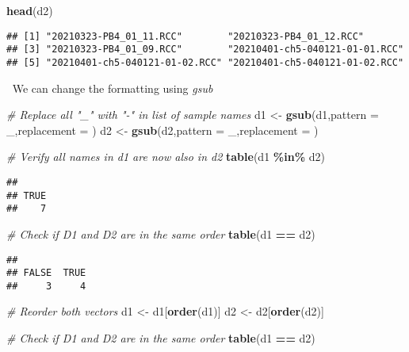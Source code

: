 \documentclass[
]{article}
\newenvironment{Shaded}{\begin{snugshade}}{\end{snugshade}}
\newcommand{\AttributeTok}[1]{\textcolor[rgb]{0.13,0.29,0.53}{#1}}
\newcommand{\CommentTok}[1]{\textcolor[rgb]{0.56,0.35,0.01}{\textit{#1}}}
\newcommand{\FunctionTok}[1]{\textcolor[rgb]{0.13,0.29,0.53}{\textbf{#1}}}
\newcommand{\NormalTok}[1]{#1}
\newcommand{\OtherTok}[1]{\textcolor[rgb]{0.56,0.35,0.01}{#1}}
\newcommand{\SpecialCharTok}[1]{\textcolor[rgb]{0.81,0.36,0.00}{\textbf{#1}}}
\newcommand{\StringTok}[1]{\textcolor[rgb]{0.31,0.60,0.02}{#1}}
\begin{document}
\begin{Shaded}
\begin{Highlighting}[]
\FunctionTok{head}\NormalTok{(d2)}
\end{Highlighting}
\end{Shaded}

\begin{verbatim}
## [1] "20210323-PB4_01_11.RCC"        "20210323-PB4_01_12.RCC"       
## [3] "20210323-PB4_01_09.RCC"        "20210401-ch5-040121-01-01.RCC"
## [5] "20210401-ch5-040121-01-02.RCC" "20210401-ch5-040121-01-02.RCC"
\end{verbatim}

\(~\) We can change the formatting using \emph{gsub}

\begin{Shaded}
\begin{Highlighting}[]
\CommentTok{\# Replace all "\_" with "{-}" in list of sample names}
\NormalTok{d1 }\OtherTok{\textless{}{-}} \FunctionTok{gsub}\NormalTok{(d1,}\AttributeTok{pattern =} \StringTok{\textquotesingle{}\_\textquotesingle{}}\NormalTok{,}\AttributeTok{replacement =} \StringTok{\textquotesingle{}{-}\textquotesingle{}}\NormalTok{)}
\NormalTok{d2 }\OtherTok{\textless{}{-}} \FunctionTok{gsub}\NormalTok{(d2,}\AttributeTok{pattern =} \StringTok{\textquotesingle{}\_\textquotesingle{}}\NormalTok{,}\AttributeTok{replacement =} \StringTok{\textquotesingle{}{-}\textquotesingle{}}\NormalTok{)}

\CommentTok{\# Verify all names in d1 are now also in d2}
\FunctionTok{table}\NormalTok{(d1 }\SpecialCharTok{\%in\%}\NormalTok{ d2)}
\end{Highlighting}
\end{Shaded}

\begin{verbatim}
## 
## TRUE 
##    7
\end{verbatim}

\begin{Shaded}
\begin{Highlighting}[]
\CommentTok{\# Check if D1 and D2 are in the same order}
\FunctionTok{table}\NormalTok{(d1 }\SpecialCharTok{==}\NormalTok{ d2)}
\end{Highlighting}
\end{Shaded}

\begin{verbatim}
## 
## FALSE  TRUE 
##     3     4
\end{verbatim}

\begin{Shaded}
\begin{Highlighting}[]
\CommentTok{\# Reorder both vectors}
\NormalTok{d1 }\OtherTok{\textless{}{-}}\NormalTok{ d1[}\FunctionTok{order}\NormalTok{(d1)]}
\NormalTok{d2 }\OtherTok{\textless{}{-}}\NormalTok{ d2[}\FunctionTok{order}\NormalTok{(d2)]}

\CommentTok{\# Check if D1 and D2 are in the same order}
\FunctionTok{table}\NormalTok{(d1 }\SpecialCharTok{==}\NormalTok{ d2)}
\end{Highlighting}
\end{Shaded}
\end{document}
